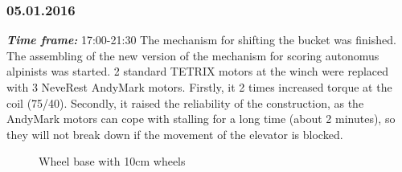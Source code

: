 \subsubsection{05.01.2016}
\textit{\textbf{Time frame:}} 17:00-21:30 \newline
The mechanism for shifting the bucket was finished.
The assembling of the new version of the mechanism for scoring autonomus alpinists was started.
2 standard TETRIX motors at the winch were replaced with 3 NeveRest AndyMark motors. Firstly, it 2 times increased torque at the coil (75/40). Secondly, it raised the reliability of the construction, as the AndyMark motors can cope with stalling for a long time (about 2 minutes), so they will not break down if the movement of the elevator is blocked.

\begin{figure}[H]
	\begin{minipage}[h]{1\linewidth}
		\caption{Wheel base with 10cm wheels}
		\label{wheeel_base_10cm_wheels}
	\end{minipage}
\end{figure}

